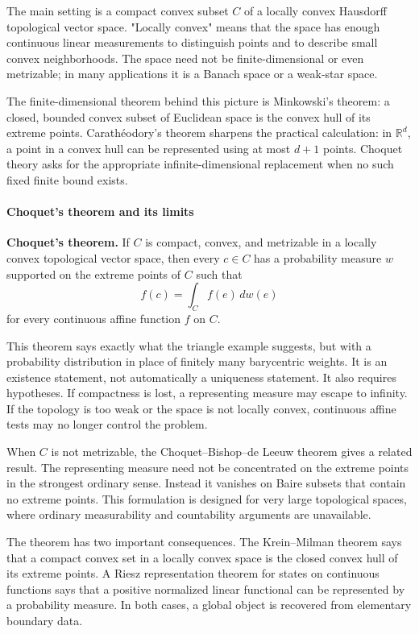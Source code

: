 The main setting is a compact convex subset $C$ of a locally convex Hausdorff topological vector space. "Locally convex" means that the space has enough continuous linear measurements to distinguish points and to describe small convex neighborhoods. The space need not be finite-dimensional or even metrizable; in many applications it is a Banach space or a weak-star space. \cite{choquet_theory_ref1,choquet_theory_ref2}

The finite-dimensional theorem behind this picture is Minkowski's theorem: a closed, bounded convex subset of Euclidean space is the convex hull of its extreme points. Carathéodory's theorem sharpens the practical calculation: in $\mathbb R^d$, a point in a convex hull can be represented using at most $d+1$ points. Choquet theory asks for the appropriate infinite-dimensional replacement when no such fixed finite bound exists.

\paragraph{Choquet's theorem and its limits}

\textbf{Choquet's theorem.} If $C$ is compact, convex, and metrizable in a locally convex topological vector space, then every $c\in C$ has a probability measure $w$ supported on the extreme points of $C$ such that
\[
 f(c)=\int_C f(e)\,dw(e)
\]
for every continuous affine function $f$ on $C$. \cite{choquet_theory_ref1,choquet_theory_ref2}

This theorem says exactly what the triangle example suggests, but with a probability distribution in place of finitely many barycentric weights. It is an existence statement, not automatically a uniqueness statement. It also requires hypotheses. If compactness is lost, a representing measure may escape to infinity. If the topology is too weak or the space is not locally convex, continuous affine tests may no longer control the problem.

When $C$ is not metrizable, the Choquet--Bishop--de Leeuw theorem gives a related result. The representing measure need not be concentrated on the extreme points in the strongest ordinary sense. Instead it vanishes on Baire subsets that contain no extreme points. This formulation is designed for very large topological spaces, where ordinary measurability and countability arguments are unavailable. \cite{choquet_theory_ref3}

The theorem has two important consequences. The Krein--Milman theorem says that a compact convex set in a locally convex space is the closed convex hull of its extreme points. A Riesz representation theorem for states on continuous functions says that a positive normalized linear functional can be represented by a probability measure. In both cases, a global object is recovered from elementary boundary data. \cite{choquet_theory_ref1,choquet_theory_ref2}

